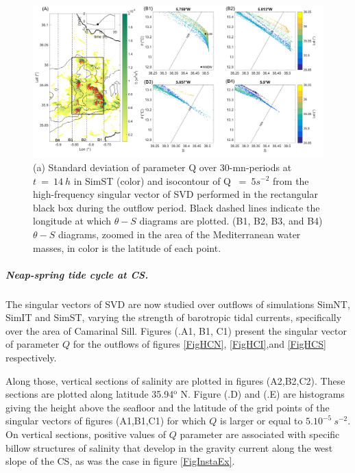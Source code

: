 \begin{figure}[!h]
 \includegraphics[width=\textwidth]{./GBR3D/TS_coupes_14H_VE2o.png}
 \caption [(A) Standard deviation of parameter Q and SVD field of Q. (B) $\theta-S$ diagrams.]{(a) Standard deviation of parameter Q over 30-mn-periods at $t\ =\ 14\ h$ in SimST (color) and isocontour of Q $\ =\ 5 s^{-2}$ from the high-frequency singular vector of SVD performed in the rectangular black box during the outflow period. Black dashed lines indicate the longitude at which $\theta-S$ diagrams are plotted. (B1, B2, B3, and B4) $\theta-S$ diagrams, zoomed in the area of the Mediterranean water masses, in color is the latitude of each point.}
 \label{FigTSCS}
\end{figure}

\subparagraph{Neap-spring tide cycle at CS.}
The singular vectors of SVD are now studied over outflows of simulations SimNT, SimIT and SimST, varying the strength of barotropic tidal currents, specifically over the area of Camarinal Sill. Figures (.A1, B1, C1) present the singular vector of parameter $Q$ for the outflows of figures \ref{FigHCN}, \ref{FigHCI},and \ref{FigHCS} respectively.

Along those, vertical sections of salinity are plotted in figures (A2,B2,C2). These sections are plotted along latitude 35.94$^\text{o}$ N. Figure (.D) and (.E) are histograms giving the height above the seafloor and the latitude of the grid points of the singular vectors of figures (A1,B1,C1) for which $Q$ is larger or equal to $5.10^{-5}\ s^{-2}$. On vertical sections, positive values of $Q$ parameter are associated with specific billow structures of salinity that develop in the gravity current along the west slope of the CS, as was the case in figure \ref{FigInstaEx}. 

